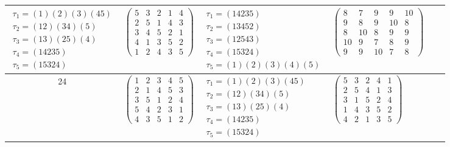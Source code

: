 \begin{longtable}{|c|p{2.7cm}|p{2.7cm}|p{2.7cm}|p{2.7cm}|p{3.3cm}|}
    $\begin{array}{l}\tau_{1}=(1)(2)(3)(45)\\ \tau_{2}=(12)(34)(5)\\ \tau_{3}=(13)(25)(4)\\ \tau_{4}=(14235)\\ \tau_{5}=(15324)\end{array}$     &
    $\begin{pmatrix}5&3&2&1&4\\2&5&1&4&3\\3&4&5&2&1\\4&1&3&5&2\\1&2&4&3&5\end{pmatrix}$                                                         &
    $\begin{array}{l}\tau_{1}=(14235)\\ \tau_{2}=(13452)\\ \tau_{3}=(12543)\\ \tau_{4}=(15324)\\ \tau_{5}=(1)(2)(3)(4)(5)\end{array}$           &
    $\begin{pmatrix}8&7&9&9&10\\9&8&9&10&8\\8&10&8&9&9\\10&9&7&8&9\\9&9&10&7&8\end{pmatrix}$                                                                                                                                \\
    \hline
    24                                                                                                                                          &
    $\begin{pmatrix}1&2&3&4&5\\2&1&4&5&3\\3&5&1&2&4\\5&4&2&3&1\\4&3&5&1&2\end{pmatrix}$                                                         &
    $\begin{array}{l}\tau_{1}=(1)(2)(3)(45)\\ \tau_{2}=(12)(34)(5)\\ \tau_{3}=(13)(25)(4)\\ \tau_{4}=(14235)\\ \tau_{5}=(15324)\end{array}$     &
    $\begin{pmatrix}5&3&2&4&1\\2&5&4&1&3\\3&1&5&2&4\\1&4&3&5&2\\4&2&1&3&5\end{pmatrix}$                                                         &

\end{longtable}
